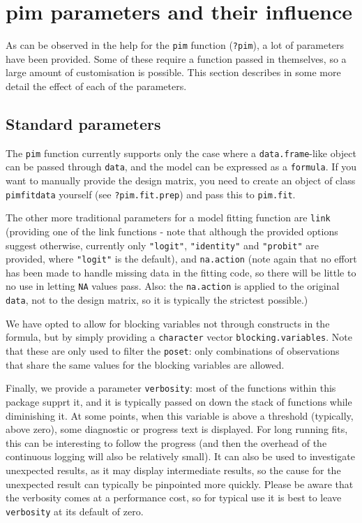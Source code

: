 \documentclass[12pt]{article}
\newcommand{\pim}[1]{\texttt{#1}}%
\newcommand{\cd}[1]{\texttt{#1}}%
\begin{document}
\section{pim parameters and their influence}\label{S_parms}
As can be observed in the help for the \pim{pim} function (\cd{?pim}), a lot of parameters have been provided. Some of these require a function passed in themselves, so a large amount of customisation is possible. This section describes in some more detail the effect of each of the parameters.
\subsection{Standard parameters}\label{SS_spar}
The \pim{pim} function currently supports only the case where a \cd{data.frame}-like object can be passed through \cd{data}, and the model can be expressed as a \cd{formula}. If you want to manually provide the design matrix, you need to create an object of class \cd{pimfitdata} yourself (see \cd{?pim.fit.prep}) and pass this to \pim{pim.fit}.

The other more traditional parameters for a model fitting function are \cd{link} (providing one of the link functions - note that although the provided options suggest otherwise, currently only \cd{"logit"}, \cd{"identity"} and \cd{"probit"} are provided, where \cd{"logit"} is the default), and \cd{na.action} (note again that no effort has been made to handle missing data in the fitting code, so there will be little to no use in letting \cd{NA} values pass. Also: the \cd{na.action} is applied to the original \cd{data}, not to the design matrix, so it is typically the strictest possible.)

We have opted to allow for blocking variables not through constructs in the formula, but by simply providing a \cd{character} vector \cd{blocking.variables}. Note that these are only used to filter the \cd{poset}: only combinations of observations that share the same values for the blocking variables are allowed.

Finally, we provide a parameter \cd{verbosity}: most of the functions within this package supprt it, and it is typically passed on down the stack of functions while diminishing it. At some points, when this variable is above a threshold (typically, above zero), some diagnostic or progress text is displayed. For long running fits, this can be interesting to follow the progress (and then the overhead of the continuous logging will also be relatively small). It can also be used to investigate unexpected results, as it may display intermediate results, so the cause for the unexpected result can typically be pinpointed more quickly. Please be aware that the verbosity comes at a performance cost, so for typical use it is best to leave \cd{verbosity} at its default of zero.
\end{document}
